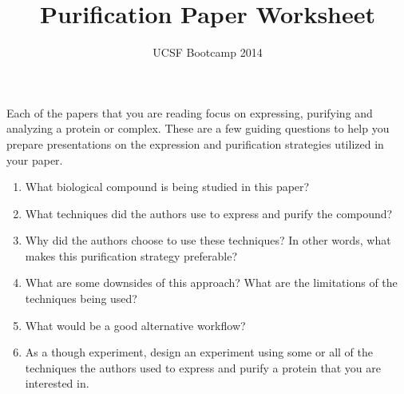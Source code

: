 \documentclass[twoside]{article}
\begin{document}
  \title{Purification Paper Worksheet} \author{UCSF Bootcamp 2014}
  \maketitle
  Each of the papers that you are reading focus on expressing, purifying and analyzing a protein or complex. These are a few guiding questions to help you prepare presentations on the expression and purification strategies utilized in your paper.
  \begin{enumerate}
    
    \item What biological compound is being studied in this paper?
    \item What techniques did the authors use to express and purify the compound?
    \item Why did the authors choose to use these techniques? In other words, what makes this purification strategy preferable?
    \item What are some downsides of this approach? What are the limitations of the techniques being used?
    \item What would be a good alternative workflow?
    \item As a though experiment, design an experiment using some or all of the techniques the authors used to express and purify a protein that you are interested in.

  \end{enumerate}
\end{document}
